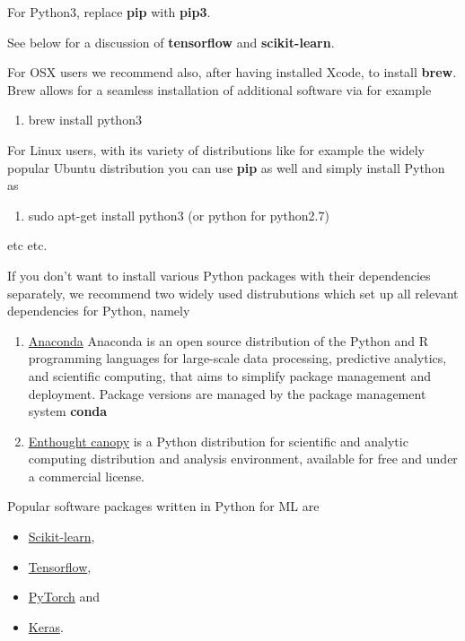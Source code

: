 \documentclass[%
oneside,                 %
final,                   %
10pt]{article}
\begin{document}
\noindent
For Python3, replace \textbf{pip} with \textbf{pip3}.

See below for a discussion of \textbf{tensorflow} and \textbf{scikit-learn}. 

For OSX users we recommend also, after having installed Xcode, to install \textbf{brew}. Brew allows 
for a seamless installation of additional software via for example
\begin{enumerate}
\item brew install python3
\end{enumerate}

\noindent
For Linux users, with its variety of distributions like for example the widely popular Ubuntu distribution
you can use \textbf{pip} as well and simply install Python as 
\begin{enumerate}
\item sudo apt-get install python3  (or python for python2.7)
\end{enumerate}

\noindent
etc etc. 

If you don't want to install various Python packages with their dependencies separately, we recommend two widely used distrubutions which set up  all relevant dependencies for Python, namely
\begin{enumerate}
\item \href{{https://docs.anaconda.com/}}{Anaconda} Anaconda is an open source distribution of the Python and R programming languages for large-scale data processing, predictive analytics, and scientific computing, that aims to simplify package management and deployment. Package versions are managed by the package management system \textbf{conda}

\item \href{{https://www.enthought.com/product/canopy/}}{Enthought canopy}  is a Python distribution for scientific and analytic computing distribution and analysis environment, available for free and under a commercial license.
\end{enumerate}

\noindent
Popular software packages written in Python for ML are

\begin{itemize}
\item \href{{http://scikit-learn.org/stable/}}{Scikit-learn}, 

\item \href{{https://www.tensorflow.org/}}{Tensorflow},

\item \href{{http://pytorch.org/}}{PyTorch} and 

\item \href{{https://keras.io/}}{Keras}.
\end{itemize}
\end{document}
